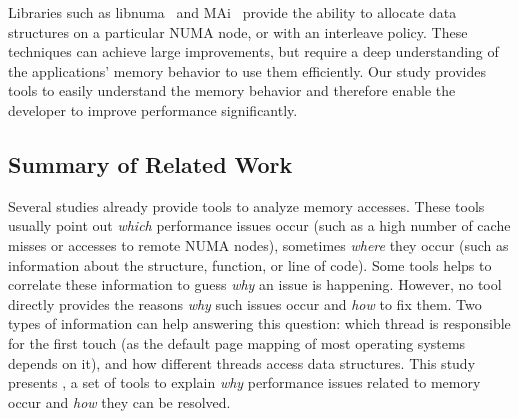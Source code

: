 Libraries such as libnuma~\cite{Kleen2004} and MAi~\cite{Ribeiro2009} provide
the ability to allocate data structures on a particular NUMA node, or with an
interleave policy. These techniques can achieve large improvements, but
require a deep understanding of the applications' memory behavior to use them
efficiently.
Our study provides tools to easily understand the memory behavior
and therefore enable the developer to improve performance significantly.

%

\subsection{Summary of Related Work}

Several studies already provide tools to analyze memory accesses.
These tools usually point out \emph{which} performance issues occur (such as a
high number of cache misses or accesses to remote NUMA nodes), sometimes
\emph{where} they occur (such as information about the structure, function, or
line of code). Some tools helps to correlate these information to
guess \emph{why} an issue is happening. However, no tool directly provides the
reasons \emph{why} such issues occur and \emph{how} to fix them.
Two types of information can help answering this question: which thread is responsible for the first touch (as the default page mapping of most operating systems depends on it), and how different threads access data structures.
This study presents \TABARNAC, a set of tools to explain \emph{why} performance issues
related to memory occur and \emph{how} they can be resolved.





